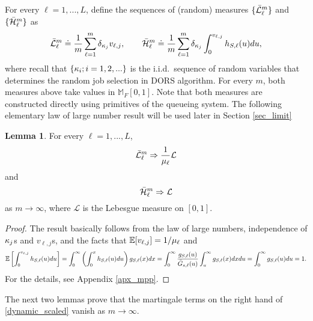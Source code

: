 \documentclass{article}
\theoremstyle{definition}
\newtheorem{lemma}[theorem]{Lemma}
\numberwithin{equation}{section}
\begin{document}
For every $\ell=1,...,L$, define the sequences of (random) measures $\{\bar{\mathcal{L}}_\ell^m\}$ and $\{\bar{\mathcal{H}}_\ell^m\}$ as
\begin{equation}\label{def_kappaMeasure}
  \bar{\mathcal{L}}^m_\ell \doteq \frac{1}{m}\sum_{\ell=1}^{m} \delta_{\kappa_j} v_{\ell,j},\quad\quad \bar{\mathcal{H}}^m_\ell \doteq \frac{1}{m}\sum_{\ell=1}^{m} \delta_{\kappa_j} \int_0^{v_{\ell,j}}h_{S,\ell}(u)du,
\end{equation}
where recall that $\{\kappa_i;i=1,2,...\}$ is the i.i.d.\ sequence of random variables that determines the random job selection in DORS algorithm. For every $m$, both measures above take values in $\mathbb{M}_{F}[0,1]$. Note that both measures are constructed directly using primitives of the queueing system. The following elementary  law of large number result will be used later in Section \ref{sec_limit}




\begin{lemma}\label{lem_llnKappa}
For every $\ell=1,...,L$,
\begin{equation}\label{llnK}
   \bar{\mathcal{L}}^m_\ell \Rightarrow \frac{1}{\mu_\ell}\mathcal{L}
\end{equation}
and
\begin{equation}\label{llnA}
   \bar{\mathcal{H}}^m_\ell \Rightarrow \mathcal{L}
\end{equation}
as $m\to\infty$, where $\mathcal{L}$ is the Lebesgue measure on $[0,1]$.
\end{lemma}
\begin{proof}
  The result basically follows from the law of large numbers, independence of $\kappa_j$s and $v_{\ell,j}$s, and the facts that $\mathbb{E}[v_{\ell,j}]=1/\mu_\ell$ and
  \[\mathbb{E}\left[\int_0^{v_{\ell,j}}h_{S,\ell}(u)du\right]=\int_0^\infty \left(\int_0^xh_{S,\ell}(u)du\right)g_{S,\ell}(x)dx = \int_0^\infty \frac{g_{S,\ell}(u)}{\bar G_{s,\ell}(u)}\int_u^\infty g_{S,\ell}(x)dxdu=\int_0^\infty g_{S,\ell}(u)du=1.\]
  For the details, see Appendix \ref{apx_mpp}.
\end{proof}

The next two lemmas prove that the martingale terms on the right hand of \eqref{dynamic_scaled} vanish as $m\to\infty$.
\end{document}
